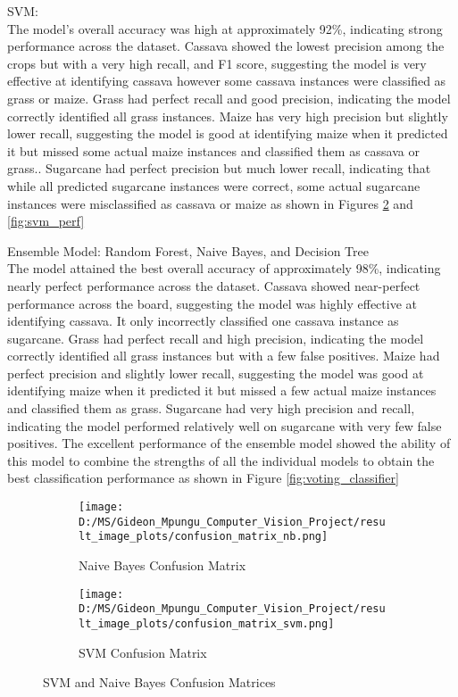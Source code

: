 \documentclass[10pt,twocolumn,letterpaper]{article}
\begin{document}
SVM: \\
The model's overall accuracy was high at approximately 92\%, indicating strong performance across the dataset. Cassava showed the lowest precision among the crops but with a very high recall, and F1 score, suggesting the model is very effective at identifying cassava however some cassava instances were classified as grass or maize. Grass had perfect recall and good precision, indicating the model correctly identified all grass instances. Maize has very high precision but slightly lower recall, suggesting the model is good at identifying maize when it predicted it but missed some actual maize instances and classified them as cassava or grass..
Sugarcane had perfect precision but much lower recall, indicating that while all predicted sugarcane instances were correct, some actual sugarcane instances were misclassified as cassava or maize as shown in Figures \ref{fig:svm_cm} and \ref{fig:svm_perf}


Ensemble Model: Random Forest, Naive Bayes, and Decision Tree \\
The model attained the best overall accuracy of approximately 98\%, indicating nearly perfect performance across the dataset. Cassava showed near-perfect performance across the board, suggesting the model was highly effective at identifying cassava. It only incorrectly classified one cassava instance as sugarcane. Grass had perfect recall and high precision, indicating the model correctly identified all grass instances but with a few false positives. Maize had perfect precision and slightly lower recall, suggesting the model was good at identifying maize when it predicted it but missed a few actual maize instances and classified them as grass. Sugarcane had very high precision and  recall, indicating the model performed relatively well on sugarcane with very few false positives. The excellent performance of the ensemble model showed the ability of this model to combine the strengths of all the individual models to obtain the best classification performance as shown in Figure \ref{fig:voting_classifier}

\begin{figure*}[ht]
    \centering
    
    \begin{subfigure}{0.45\textwidth}
        \texttt{[image: D:/MS/Gideon\_Mpungu\_Computer\_Vision\_Project/result\_image\_plots/confusion\_matrix\_nb.png]}
        \caption{Naive Bayes Confusion Matrix}
        \label{fig:nb_cm}
    \end{subfigure}
    \hfill
    \begin{subfigure}{0.45\textwidth}
        \texttt{[image: D:/MS/Gideon\_Mpungu\_Computer\_Vision\_Project/result\_image\_plots/confusion\_matrix\_svm.png]}
        \caption{SVM Confusion Matrix}
        \label{fig:svm_cm}
    \end{subfigure}
    
    \caption{SVM and Naive Bayes Confusion Matrices}
    \label{fig:svm_and_nb_cm}
\end{figure*}
\end{document}
